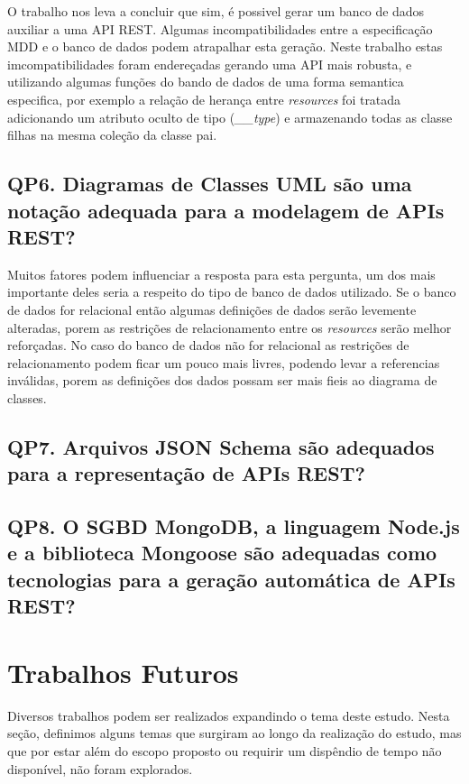O trabalho nos leva a concluir que sim, é possivel gerar um banco de dados auxiliar a uma API REST. Algumas incompatibilidades entre a especificação MDD e o banco de dados podem atrapalhar esta geração. Neste trabalho estas imcompatibilidades foram endereçadas gerando uma API mais robusta, e utilizando algumas funções do bando de dados de uma forma semantica especifica, por exemplo a relação de herança entre \textit{resources} foi tratada adicionando um atributo oculto de tipo (\textit{\_\_type}) e armazenando todas as classe filhas na mesma coleção da classe pai.

\subsection{QP6. Diagramas de Classes UML são uma notação adequada para a modelagem de APIs REST?}

Muitos fatores podem influenciar a resposta para esta pergunta, um dos mais importante deles seria a respeito do tipo de banco de dados utilizado. Se o banco de dados for relacional então algumas definições de dados serão levemente alteradas, porem as restrições de relacionamento entre os \textit{resources} serão melhor reforçadas. No caso do banco de dados não for relacional as restrições de relacionamento podem ficar um pouco mais livres, podendo levar a referencias inválidas, porem as definições dos dados possam ser mais fieis ao diagrama de classes.

\subsection{QP7. Arquivos JSON Schema são adequados para a representação de APIs REST?}

\subsection{QP8. O SGBD MongoDB, a linguagem Node.js e a biblioteca Mongoose são adequadas como tecnologias para a geração automática de APIs REST?}


\section{Trabalhos Futuros}

Diversos trabalhos podem ser realizados expandindo o tema deste estudo. Nesta seção, definimos alguns temas que surgiram ao longo da realização do estudo, mas que por estar além do escopo proposto ou requirir um dispêndio de tempo não disponível, não foram explorados.

